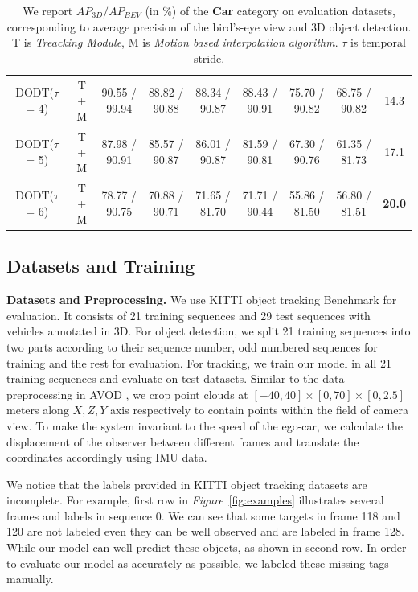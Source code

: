 \documentclass[a4paper, 10pt, conference]{ieeeconf}      %
\def\figurename{\emph{Figure}}
\begin{document}
\begin{table}
{\begin{tabular}{ccccccccc}
			\multicolumn{1}{c|}{DODT($\tau$ = 4)}     &\multicolumn{1}{c|}{T + M} & 90.55 / 99.94  & 88.82 / 90.88 & \multicolumn{1}{c|}{88.34 / 90.87}  & 88.43 / 90.91 & 75.70 / 90.82 & \multicolumn{1}{c|}{68.75 / 90.82}   & 14.3\\
			\multicolumn{1}{c|}{DODT($\tau$ = 5)}     &\multicolumn{1}{c|}{T + M} & 87.98 / 90.91  & 85.57 / 90.87 & \multicolumn{1}{c|}{86.01 / 90.87}  & 81.59 / 90.81 & 67.30 / 90.76 & \multicolumn{1}{c|}{61.35 / 81.73}   & 17.1\\
			\multicolumn{1}{c|}{DODT($\tau$ = 6)}     &\multicolumn{1}{c|}{T + M} & 78.77 / 90.75  & 70.88 / 90.71 & \multicolumn{1}{c|}{71.65 / 81.70}  & 71.71 / 90.44 & 55.86 / 81.50 & \multicolumn{1}{c|}{56.80 / 81.51}   & \textbf{20.0} \\ \midrule
	\end{tabular}}
	\setlength{\abovecaptionskip}{1.5pt}
	\caption{We report $AP_{3D}/AP_{BEV}$ (in \%) of the \textbf{Car} category on evaluation datasets, corresponding to average precision of the bird’s-eye view and 3D object detection. T is \textit{Treacking Module}, M is \textit{Motion based interpolation algorithm}. $\tau$ is temporal stride.} 
	\label{table:result_detection}
	\vspace{-0.6cm}
\end{table}

\subsection{Datasets and Training}

\textbf{Datasets and Preprocessing.} We use KITTI object tracking Benchmark \cite{geiger2013vision} for evaluation. It consists of 21 training sequences and 29 test sequences with vehicles annotated in 3D. For object detection, we split 21 training sequences into two parts according to their sequence number, odd numbered sequences for training and the rest for evaluation. For tracking, we train our model in all 21 training sequences and evaluate on test datasets. Similar to the data preprocessing in AVOD \cite{ku2018joint}, we crop point clouds at $[-40, 40] \times [0, 70] \times [0, 2.5]$ meters along $X, Z, Y$ axis respectively to contain points within the field of camera view. To make the system invariant to the speed of the ego-car, we calculate the displacement of the observer between different frames and translate the coordinates accordingly using IMU data. 

We notice that the labels provided in KITTI object tracking datasets are incomplete. For example, first row in \figurename \, \ref{fig:examples} illustrates several frames and labels in sequence 0. We can see that some targets in frame 118 and 120 are not labeled even they can be well observed and are labeled in frame 128. While our model can well predict these objects, as shown in second row. In order to evaluate our model as accurately as possible, we labeled these missing tags manually.
\end{document}
